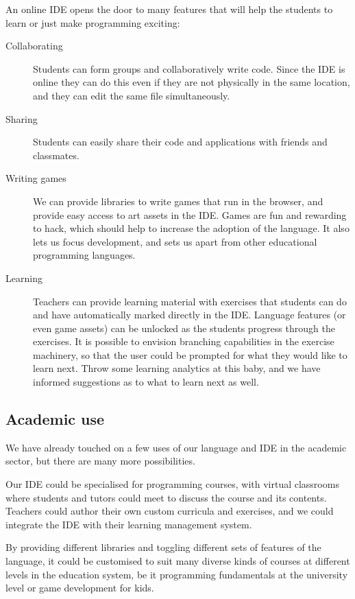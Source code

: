 An online IDE opens the door to many features that will help the students to
learn or just make programming exciting:
\begin{description}
  \item[Collaborating]
    Students can form groups and collaboratively write code. Since the IDE is
    online they can do this even if they are not physically in the same
    location, and they can edit the same file simultaneously.
  \item[Sharing]
    Students can easily share their code and applications with friends and
    classmates.
  \item[Writing games] 
    We can provide libraries to write games that run in the browser, and
    provide easy access to art assets in the IDE. Games are fun and rewarding
    to hack, which should help to increase the adoption of the language. It
    also lets us focus development, and sets us apart from other educational
    programming languages.
  \item[Learning]
    Teachers can provide learning material with exercises that students can do
    and have automatically marked directly in the IDE. Language features (or
    even game assets) can be unlocked as the students progress through the
    exercises. It is possible to envision branching capabilities in the
    exercise machinery, so that the user could be prompted for what they would
    like to learn next.  Throw some learning analytics at this baby, and we
    have informed suggestions as to what to learn next as well.
\end{description}

\subsection{Academic use}

We have already touched on a few uses of our language and IDE in the academic
sector, but there are many more possibilities.

Our IDE could be specialised for programming courses, with virtual classrooms
where students and tutors could meet to discuss the course and its contents.
Teachers could author their own custom curricula and exercises, and we could
integrate the IDE with their learning management system.

By providing different libraries and toggling different sets of features of the
language, it could be customised to suit many diverse kinds of courses at
different levels in the education system, be it programming fundamentals at the
university level or game development for kids.

